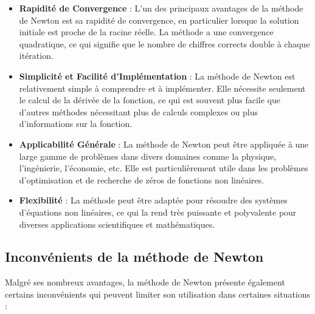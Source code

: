 \documentclass{article}
\begin{document}
\begin{itemize}
    \item \textbf{Rapidité de Convergence} : L'un des principaux avantages de la méthode de Newton est sa rapidité de convergence, en particulier lorsque la solution initiale est proche de la racine réelle. La méthode a une convergence quadratique, ce qui signifie que le nombre de chiffres corrects double à chaque itération.
    \item \textbf{Simplicité et Facilité d'Implémentation} : La méthode de Newton est relativement simple à comprendre et à implémenter. Elle nécessite seulement le calcul de la dérivée de la fonction, ce qui est souvent plus facile que d'autres méthodes nécessitant plus de calculs complexes ou plus d'informations sur la fonction.
    \item \textbf{Applicabilité Générale} : La méthode de Newton peut être appliquée à une large gamme de problèmes dans divers domaines comme la physique, l'ingénierie, l'économie, etc. Elle est particulièrement utile dans les problèmes d'optimisation et de recherche de zéros de fonctions non linéaires.
    \item \textbf{Flexibilité} : La méthode peut être adaptée pour résoudre des systèmes d'équations non linéaires, ce qui la rend très puissante et polyvalente pour diverses applications scientifiques et mathématiques.
\end{itemize}

\subsection{Inconvénients de la méthode de Newton}
Malgré ses nombreux avantages, la méthode de Newton présente également certains inconvénients qui peuvent limiter son utilisation dans certaines situations :
\end{document}
